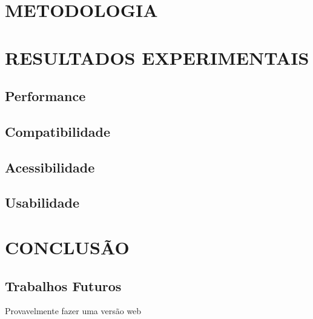\documentclass[12pt,a4paper]{article}
\begin{document}
	\section{METODOLOGIA}
		
	\clearpage

	\section{RESULTADOS EXPERIMENTAIS}

		\lipsum[1]

		\subsection{Performance}

			\lipsum[1]

		\subsection{Compatibilidade}

			\lipsum[1]

		\subsection{Acessibilidade}

			\lipsum[1]

		\subsection{Usabilidade}

			\lipsum[1]


	\section{CONCLUSÃO}

	\lipsum[1]

		\subsection{Trabalhos Futuros}

			\par Provavelmente fazer uma versão web
\end{document}
